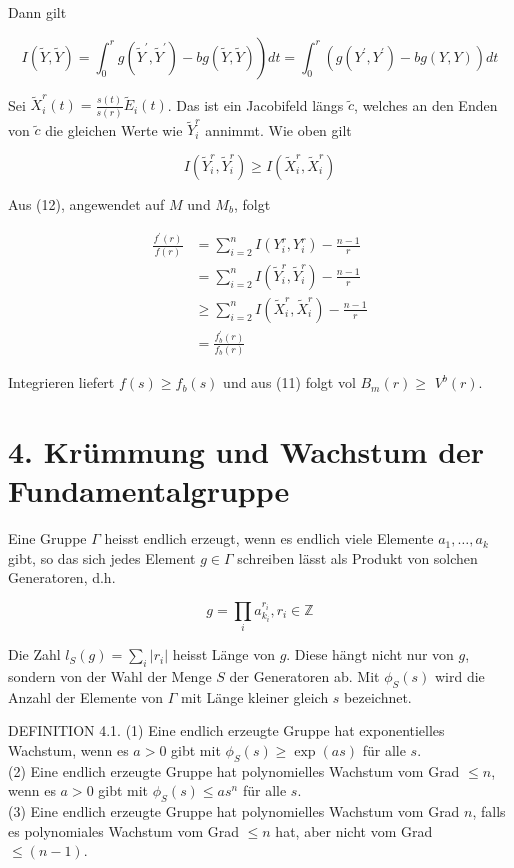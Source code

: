 \documentclass[10pt, letterpaper]{article}
\begin{document}
Dann gilt

$$
\left.I(\tilde{Y}, \tilde{Y})=\int_{0}^{r} g\left(\tilde{Y}^{\prime}, \tilde{Y}^{\prime}\right)-b g(\tilde{Y}, \tilde{Y})\right) d t=\int_{0}^{r}\left(g\left(Y^{\prime}, Y^{\prime}\right)-b g(Y, Y)\right) d t
$$

Sei $\tilde{X}_{i}^{r}(t)=\frac{s(t)}{s(r)} \tilde{E}_{i}(t)$. Das ist ein Jacobifeld längs $\tilde{c}$, welches an den Enden von $\tilde{c}$ die gleichen Werte wie $\tilde{Y}_{i}^{r}$ annimmt. Wie oben gilt

$$
I\left(\tilde{Y}_{i}^{r}, \tilde{Y}_{i}^{r}\right) \geq I\left(\tilde{X}_{i}^{r}, \tilde{X}_{i}^{r}\right)
$$

Aus (12), angewendet auf $M$ und $M_{b}$, folgt

$$
\begin{aligned}
\frac{f^{\prime}(r)}{f(r)} & =\sum_{i=2}^{n} I\left(Y_{i}^{r}, Y_{i}^{r}\right)-\frac{n-1}{r} \\
& =\sum_{i=2}^{n} I\left(\tilde{Y}_{i}^{r}, \tilde{Y}_{i}^{r}\right)-\frac{n-1}{r} \\
& \geq \sum_{i=2}^{n} I\left(\tilde{X}_{i}^{r}, \tilde{X}_{i}^{r}\right)-\frac{n-1}{r} \\
& =\frac{f_{b}^{\prime}(r)}{f_{b}(r)}
\end{aligned}
$$

Integrieren liefert $f(s) \geq f_{b}(s)$ und aus (11) folgt vol $B_{m}(r) \geq$ $V^{b}(r)$.

\section*{4. Krümmung und Wachstum der Fundamentalgruppe}
Eine Gruppe $\Gamma$ heisst endlich erzeugt, wenn es endlich viele Elemente $a_{1}, \ldots, a_{k}$ gibt, so das sich jedes Element $g \in \Gamma$ schreiben lässt als Produkt von solchen Generatoren, d.h.

$$
g=\prod_{i} a_{k_{i}}^{r_{i}}, r_{i} \in \mathbb{Z}
$$

Die Zahl $l_{S}(g)=\sum_{i}\left|r_{i}\right|$ heisst Länge von $g$. Diese hängt nicht nur von $g$, sondern von der Wahl der Menge $S$ der Generatoren ab. Mit $\phi_{S}(s)$ wird die Anzahl der Elemente von $\Gamma$ mit Länge kleiner gleich $s$ bezeichnet.

DEFINITION 4.1. (1) Eine endlich erzeugte Gruppe hat exponentielles Wachstum, wenn es $a>0$ gibt mit $\phi_{S}(s) \geq \exp (a s)$ für alle $s$.\\
(2) Eine endlich erzeugte Gruppe hat polynomielles Wachstum vom Grad $\leq n$, wenn es $a>0$ gibt mit $\phi_{S}(s) \leq a s^{n}$ für alle $s$.\\
(3) Eine endlich erzeugte Gruppe hat polynomielles Wachstum vom Grad $n$, falls es polynomiales Wachstum vom Grad $\leq n$ hat, aber nicht vom Grad $\leq(n-1)$.
\end{document}

